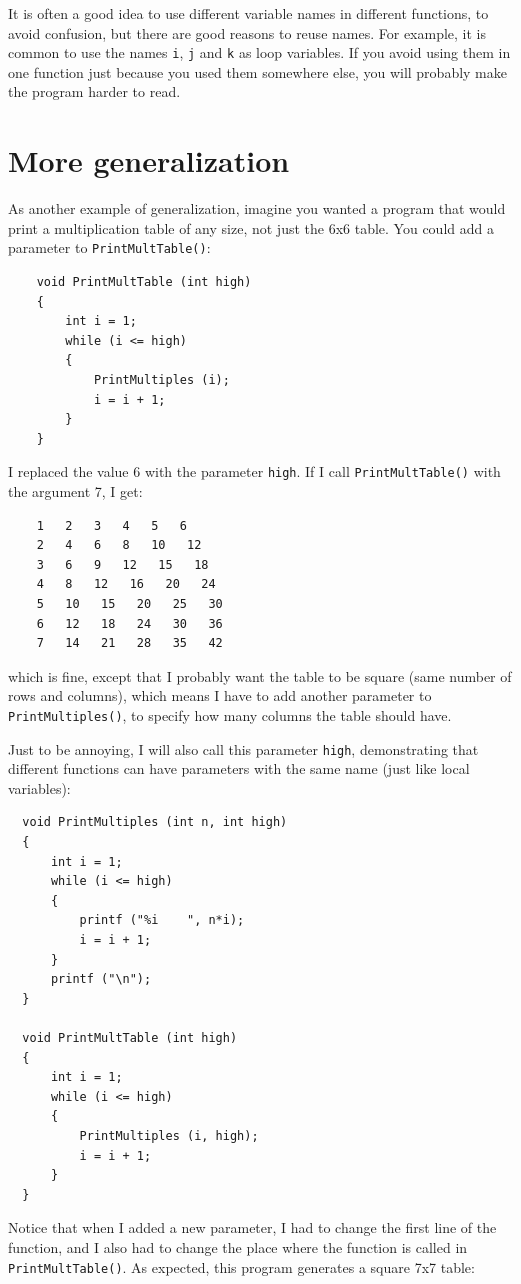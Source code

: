 It is often a good idea to use different variable names in
different functions, to avoid confusion, but there are good
reasons to reuse names.  For example, it is common to
use the names {\tt i}, {\tt j} and {\tt k} as loop variables.
If you avoid using them in one function just because you
used them somewhere else, you will probably make the program
harder to read.


\section{More generalization}
\label{More generalization}

As another example of generalization, imagine you wanted
a program that would print a multiplication table of any
size, not just the 6x6 table.  You could add a parameter to
{\tt PrintMultTable()}:

\begin{verbatim}
    void PrintMultTable (int high) 
    {
        int i = 1;
        while (i <= high) 
        {
            PrintMultiples (i);
            i = i + 1;
        }
    }
\end{verbatim}
%
I replaced the value 6 with the parameter {\tt high}.  If I
call {\tt PrintMultTable()} with the argument 7, I get:

\begin{verbatim}
    1   2   3   4   5   6   
    2   4   6   8   10   12   
    3   6   9   12   15   18   
    4   8   12   16   20   24   
    5   10   15   20   25   30   
    6   12   18   24   30   36   
    7   14   21   28   35   42   
\end{verbatim}
%
which is fine, except that I probably want the table to
be square (same number of rows and columns), which means
I have to add another parameter to {\tt PrintMultiples()},
to specify how many columns the table should have.

Just to be annoying, I will also call this parameter {\tt high},
demonstrating that different functions can have parameters
with the same name (just like local variables):

\begin{verbatim}
  void PrintMultiples (int n, int high) 
  {
      int i = 1;
      while (i <= high) 
      {
          printf ("%i    ", n*i);
          i = i + 1;
      }    
      printf ("\n");
  }

  void PrintMultTable (int high) 
  {
      int i = 1;
      while (i <= high) 
      {
          PrintMultiples (i, high);
          i = i + 1;
      }
  }
\end{verbatim}
%
Notice that when I added a new parameter, I had to change the first
line of the function, and I also had to
change the place where the function is called in {\tt PrintMultTable()}.
As expected, this program generates a square 7x7 table:

